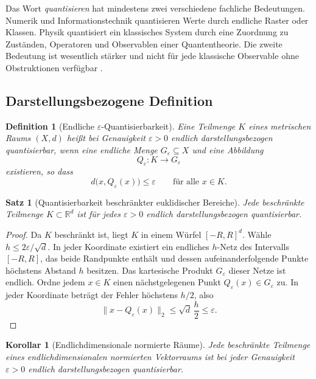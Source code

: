 \documentclass[11pt,a4paper]{article}
\newtheorem{definition}{Definition}[section]
\newtheorem{satz}{Satz}[section]
\newtheorem{korollar}{Korollar}[section]
\theoremstyle{remark}
\newcommand{\R}{\mathbb{R}}
\newcommand{\eps}{\varepsilon}
\begin{document}
Das Wort \emph{quantisieren} hat mindestens zwei verschiedene fachliche
Bedeutungen. Numerik und Informationstechnik quantisieren Werte durch endliche
Raster oder Klassen. Physik quantisiert ein klassisches System durch eine
Zuordnung zu Zuständen, Operatoren und Observablen einer Quantentheorie. Die
zweite Bedeutung ist wesentlich stärker und nicht für jede klassische
Observable ohne Obstruktionen verfügbar \citep{groenewold1946}.

\subsection{Darstellungsbezogene Definition}

\begin{definition}[Endliche \(\eps\)-Quantisierbarkeit]
Eine Teilmenge \(K\) eines metrischen Raums \((X,d)\) heißt bei Genauigkeit
\(\eps>0\) \emph{endlich darstellungsbezogen quantisierbar}, wenn eine
endliche Menge \(G_{\eps}\subseteq X\) und eine Abbildung
\[
  Q_{\eps}:K\longrightarrow G_{\eps}
\]
existieren, so dass
\[
  d\bigl(x,Q_{\eps}(x)\bigr)\le\eps
  \qquad\text{für alle }x\in K.
\]
\end{definition}

\begin{satz}[Quantisierbarkeit beschränkter euklidischer Bereiche]
\label{satz:quantisierbar}
Jede beschränkte Teilmenge \(K\subset\R^d\) ist für jedes
\(\eps>0\) endlich darstellungsbezogen quantisierbar.
\end{satz}

\begin{proof}
Da \(K\) beschränkt ist, liegt \(K\) in einem Würfel \([-R,R]^d\).
Wähle \(h\le 2\eps/\sqrt d\). In jeder Koordinate existiert ein endliches
\(h\)-Netz des Intervalls \([-R,R]\), das beide Randpunkte enthält und
dessen aufeinanderfolgende Punkte höchstens Abstand \(h\) besitzen. Das
kartesische Produkt \(G_{\eps}\) dieser Netze ist endlich. Ordne jedem
\(x\in K\) einen nächstgelegenen Punkt \(Q_{\eps}(x)\in G_{\eps}\) zu.
In jeder Koordinate beträgt der Fehler höchstens \(h/2\), also
\[
  \|x-Q_{\eps}(x)\|_2
  \le \sqrt d\,\frac h2
  \le\eps.
\]
\end{proof}

\begin{korollar}[Endlichdimensionale normierte Räume]
Jede beschränkte Teilmenge eines endlichdimensionalen normierten Vektorraums
ist bei jeder Genauigkeit \(\eps>0\) endlich darstellungsbezogen
quantisierbar.
\end{korollar}
\end{document}
